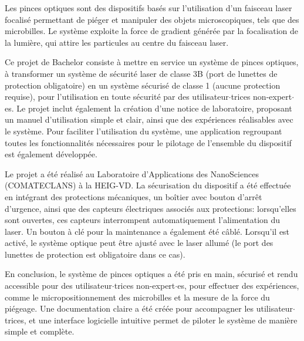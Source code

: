 Les pinces optiques sont des dispositifs basés sur l'utilisation d'un faisceau laser focalisé permettant de piéger et manipuler des objets microscopiques, tels que des microbilles. Le système exploite la force de gradient générée par la focalisation de la lumière, qui attire les particules au centre du faisceau laser.

Ce projet de Bachelor consiste à mettre en service un système de pinces optiques, à transformer un système de sécurité laser de classe 3B (port de lunettes de protection obligatoire) en un système sécurisé de classe 1 (aucune protection requise), pour l'utilisation en toute sécurité par des utilisateur\(\cdot\)trices non-expert\(\cdot\)es. Le projet inclut également la création d'une notice de laboratoire, proposant un manuel d'utilisation simple et clair, ainsi que des expériences réalisables avec le système. Pour faciliter l'utilisation du système, une application regroupant toutes les fonctionnalités nécessaires pour le pilotage de l'ensemble du dispositif est également développée.

Le projet a été réalisé au Laboratoire d'Applications des NanoSciences (COMATECLANS) à la HEIG-VD. La sécurisation du dispositif a été effectuée en intégrant des protections mécaniques, un boîtier avec bouton d'arrêt d'urgence, ainsi que des capteurs électriques associés aux protections: lorsqu'elles sont ouvertes, ces capteurs interrompent automatiquement l'alimentation du laser. Un bouton à clé pour la maintenance a également été câblé. Lorsqu'il est activé, le système optique peut être ajusté avec le laser allumé (le port des lunettes de protection est obligatoire dans ce cas).

En conclusion, le système de pinces optiques a été pris en main, sécurisé et rendu accessible pour des utilisateur\(\cdot\)trices non-expert\(\cdot\)es, pour effectuer des expériences, comme le micropositionnement des microbilles et la mesure de la force du piégeage. Une documentation claire a été créée pour accompagner les utilisateur\(\cdot\)trices, et une interface logicielle intuitive permet de piloter le système de manière simple et complète.




